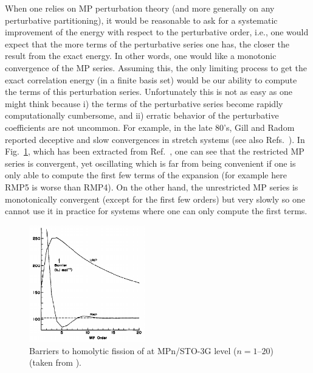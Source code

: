 \documentclass[11pt,a4paper]{article}
\begin{document}
When one relies on MP perturbation theory (and more generally on any perturbative partitioning), it would be reasonable to ask for a systematic improvement of the energy with respect to the perturbative order, i.e., one would expect that the more terms of the perturbative series one has, the closer the result from the exact energy.
In other words, one would like a monotonic convergence of the MP series. Assuming this, the only limiting process to get the exact correlation energy (in a finite basis set) would be our ability to compute the terms of this perturbation series.
Unfortunately this is not as easy as one might think because i) the terms of the perturbative series become rapidly computationally cumbersome, and ii) erratic behavior of the perturbative coefficients are not uncommon. For example, in the late 80's, Gill and Radom reported deceptive and slow convergences in stretch systems \cite{Gill_1986, Gill_1988} (see also Refs.~\cite{Handy_1985, Lepetit_1988}). 
In Fig.~\ref{fig:RUMP_Gill}, which has been extracted from Ref.~\cite{Gill_1986}, one can see that the restricted MP series is convergent, yet oscillating which is far from being convenient if one is only able to compute the first few terms of the expansion (for example here RMP5 is worse than RMP4). 
On the other hand, the unrestricted MP series is monotonically convergent (except for the first few orders) but very slowly so one cannot use it in practice for systems where one can only compute the first terms.

\begin{figure}[h!]
    \centering
    \includegraphics[width=0.45\textwidth]{gill1986.png}
    \caption{\centering Barriers to homolytic fission of  at MPn/STO-3G level ($n = 1$--$20$) (taken from \cite{Gill_1986}).}
    \label{fig:RUMP_Gill}
\end{figure}
\end{document}
